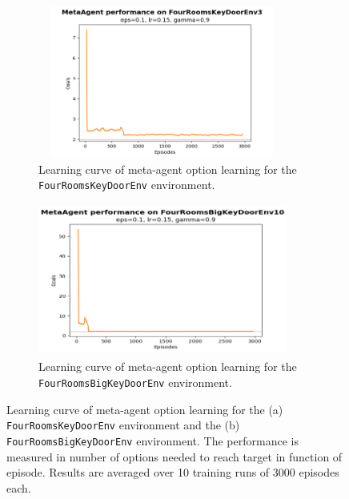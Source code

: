 \documentclass[conference]{IEEEtran}
\begin{document}
\begin{figure}[ht]
\centering
\begin{subfigure}[t]{0.45\textwidth}
\centering
\includegraphics[width=0.9\textwidth, height=5cm]{img/exp_option_her_keydoor_small.png}
\caption{Learning curve of meta-agent option learning for the \texttt{FourRoomsKeyDoorEnv} environment.}
\label{fig:exp_option_her_training_small}
\end{subfigure}
\hspace{1em}
\begin{subfigure}[t]{0.45\textwidth}
\centering
\includegraphics[width=0.9\textwidth, height=5cm]{img/exp_option_her_keydoor_big.png}
\caption{Learning curve of meta-agent option learning for the \texttt{FourRoomsBigKeyDoorEnv} environment.}
\label{fig:exp_option_her_training_big}
\end{subfigure}
\caption{Learning curve of meta-agent option learning for the (a) \texttt{FourRoomsKeyDoorEnv} environment and the (b) \texttt{FourRoomsBigKeyDoorEnv} environment. The performance is measured in number of options needed to reach target in function of episode. Results are averaged over 10 training runs of 3000 episodes each.}
\label{fig:exp_option_her_training}
\end{figure}
\end{document}
